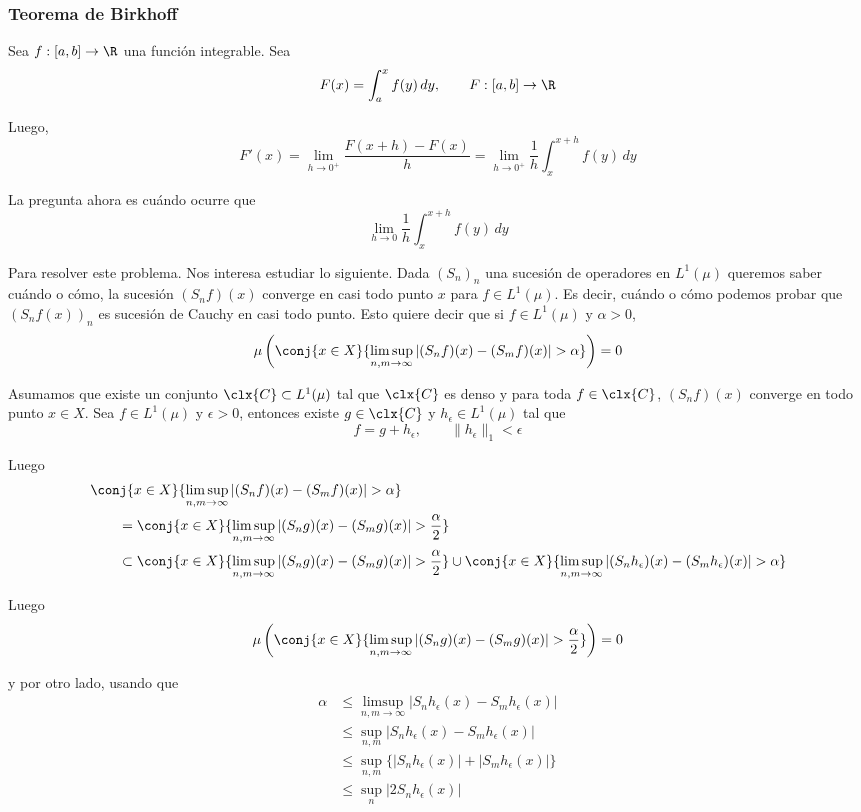 \documentclass[	docname= Sistemas\ Din\'amicos,
				finished=1,
				semester=1,
				year=2017,
				professor=Godofredo\ Iommi,
				sigla=MAT2565]{apunte}
\begin{document}
\subsubsection{Teorema de Birkhoff}
Sea $f: [a,b] \to \R$ una función integrable. Sea
	$$F(x) = \int_{a}^{x} f(y) \, dy, \qquad F: [a,b] \to \R$$ 

Luego,
	$$F'(x) = \lim_{h \to 0^{+}} \frac{F(x+h)- F(x)}{h} = \lim_{h \to 0^{+}} \frac{1}{h} \int_{x}^{x+h} f(y) \, dy$$

La pregunta ahora es cuándo ocurre que
	$$\lim_{h \to 0} \frac{1}{h} \int_{x}^{x+h} f(y) \, dy$$

Para resolver este problema. Nos interesa estudiar lo siguiente. Dada $(S_{n})_{n}$ una sucesión de operadores en $L^{1}(\mu)$ queremos saber cuándo o cómo, la sucesión $(S_{n}f)(x)$ converge en casi todo punto $x$ para $f \in L^{1}(\mu)$. Es decir, cuándo o cómo podemos probar que $(S_{n}f(x))_{n}$ es sucesión de Cauchy en casi todo punto. Esto quiere decir que si $f \in L^{1}(\mu)$ y $\alpha > 0$,
	$$\mu\left(\conj{x \in X}{\limsup_{n,m \to \infty} |(S_{n}f)(x) - (S_{m}f)(x)| > \alpha}\right) = 0$$

Asumamos que existe un conjunto $\clx{C} \subset L^{1}(\mu)$ tal que $\clx{C}$ es denso y para toda $f \in \clx{C}$, $(S_{n}f)(x)$ converge en todo punto $x \in X$. Sea $f \in L^{1}(\mu)$ y $\epsilon > 0$, entonces existe $g \in \clx{C}$ y $h_{\epsilon} \in L^{1}(\mu)$ tal que
	$$f = g + h_{\epsilon}, \qquad \|h_{\epsilon}\|_{1} < \epsilon$$

Luego
	\begin{align*}
		&\conj{x \in X}{\limsup_{n,m \to \infty} |(S_{n}f)(x) - (S_{m}f)(x)| > \alpha}	\\
			&\qquad =		\conj{x \in X}{\limsup_{n,m \to \infty} |(S_{n}g)(x) - (S_{m}g)(x)| > \frac{\alpha}{2}}	\\
			&\qquad \subset	\conj{x \in X}{\limsup_{n,m \to \infty} |(S_{n}g)(x) - (S_{m}g)(x)| > \frac{\alpha}{2}} \cup \conj{x \in X}{\limsup_{n,m \to \infty} |(S_{n}h_{\epsilon})(x) - (S_{m}h_{\epsilon})(x)| > \alpha}
	\end{align*}

Luego
	$$\mu\left(\conj{x \in X}{\limsup_{n,m \to \infty} |(S_{n}g)(x) - (S_{m}g)(x)| > \frac{\alpha}{2}}\right) = 0$$

y por otro lado, usando que
	\begin{align*}
		\alpha
			&\leq		\limsup_{n,m \to \infty} |S_{n}h_{\epsilon}(x) - S_{m}h_{\epsilon}(x)|	\\
			&\leq		\sup_{n,m} |S_{n}h_{\epsilon}(x) - S_{m}h_{\epsilon}(x)|		\\
			&\leq		\sup_{n,m} \{ |S_{n}h_{\epsilon}(x)| + |S_{m}h_{\epsilon}(x)|  \}	\\
			&\leq		\sup_{n} |2S_{n}h_{\epsilon}(x)|
	\end{align*}
\end{document}
